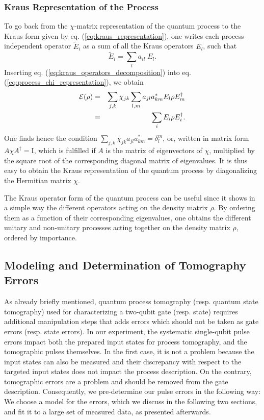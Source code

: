 \subsubsection{Kraus Representation of the Process}

To go back from the $\chi$-matrix representation of the quantum process to the Kraus form given by eq. (\ref{eq:kraus_representation}), one writes each process-independent operator $\tilde{E}_i$ as a sum of all the Kraus operators $E_l$, such that
%
\begin{equation}
	\tilde{E}_i = \sum\limits_l a_{il}\; E_l. \label{eq:kraus_operators_decomposition}
\end{equation}
%
Inserting eq. (\ref{eq:kraus_operators_decomposition}) into eq. (\ref{eq:process_chi_representation}), we obtain
%
\begin{eqnarray}
\begin{mathcal}E\end{mathcal}(\rho) & = & \sum\limits_{j,k}\chi_{jk}\sum\limits_{l,m} a_{jl}a_{km}^* E_l \rho E_m^\dagger   \label{eq:process_chi_transformed} \\
& = & \sum\limits_i E_i \rho E^\dagger_i.
\end{eqnarray}
%
One finds hence the condition $\sum\limits_{j,k} \chi_{jk}a_{jl}a_{km}^* = \delta_l^m$, or, written in matrix form $A\chi A^\dagger = \mathrm{I}$, which is fulfilled if $A$ is the matrix of eigenvectors of $\chi$, multiplied by the square root of the corresponding diagonal matrix of eigenvalues. It is thus easy to obtain the Kraus representation of the quantum process by diagonalizing the Hermitian matrix $\chi$.

\smallskip

The Kraus operator form of the quantum process can be useful since it shows in a simple way the different operators acting on the density matrix $\rho$. By ordering them as a function of their corresponding eigenvalues, one obtains the different unitary and non-unitary processes acting together on the density matrix $\rho$, ordered by importance.

\subsection{Modeling and Determination of Tomography Errors}

As already briefly mentioned, quantum process tomography (resp. quantum state tomography) used for characterizing a two-qubit gate (resp. state) requires additional manipulation steps that adds errors which should not be taken as gate errors (resp. state errors). In our experiment, the systematic single-qubit  pulse errors impact both the prepared input states for process tomography, and the tomographic pulses themselves. In the first case, it is not a problem because the input states can also be measured and their discrepancy with respect to the targeted input states does not impact the process description. On the contrary, tomographic errors are a problem and should be removed from the gate description.
Consequently, we pre-determine our pulse errors in the following way: We choose a model for the errors, which we discuss in the following two sections, and fit it to a large set of measured data, as presented afterwards.


